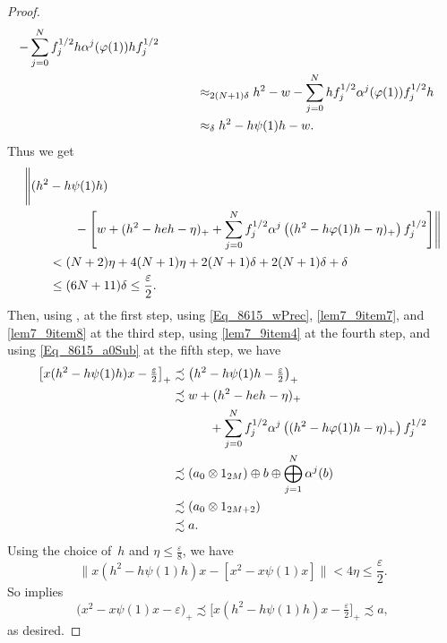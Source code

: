 \documentclass[11pt]{amsart}
\theoremstyle{plain}
\theoremstyle{definition}
\theoremstyle{remark}
\numberwithin{equation}{section}
\newcommand{\et}{\eta}
\newcommand{\ps}{\psi}
\begin{document}
\begin{proof}
\begin{align*}
 - \sum_{j = 0}^{N} f_{j}^{1/2} h \alpha^{j} (\varphi (1)) h f_{j}^{1/2}
\\
& \hspace*{3em} {\mbox{}}
\approx_{2 (N + 1) \delta}
h^{2} - w
 - \sum_{j = 0}^{N} h f_{j}^{1/2} \alpha^{j} (\varphi (1)) f_{j}^{1/2} h
\\
& \hspace*{3em} {\mbox{}}
\approx_{\delta}
h^{2} - h \psi (1) h - w.
\end{align*}
%
Thus we get
%
\begin{align*}
&
\Bigg\| (h^{2} - h \psi (1) h)
\\
& \hspace*{4em} {\mbox{}}
 - \Bigg[ w + (h^{2} - h e h - \eta)_{+}
 + \sum_{j = 0}^{N} f_{j}^{1/2}
\alpha^{j} \left((h^{2} - h \varphi (1) h - \eta)_{+} \right)
     f_{j}^{1/2} \Bigg] \Bigg\|
\\
& \hspace*{2em} {\mbox{}}
 < (N + 2) \eta + 4 (N + 1) \eta
     + 2 (N + 1) \delta + 2 (N + 1) \delta + \delta
\\
& \hspace*{2em} {\mbox{}}
 \leq (6 N + 11) \delta
 \leq \frac{\varepsilon}{2}.
\end{align*}
%
Then, using \cite[Lemma~2.3]{AGJP21}, at the first step,
using \eqref{Eq_8615_wPrec}, \eqref{lem7_9item7},
and \eqref{lem7_9item8} at the third step,
using \eqref{lem7_9item4} at the fourth step,
and using \eqref{Eq_8615_a0Sub} at the fifth step, we have
%
\begin{align*}
\big[ x ( h^2 - h \ps (1) h ) x - \tfrac{\varepsilon}{2} \big]_{+}
&
\precsim \big( h^{2} - h \psi (1) h - \tfrac{\varepsilon}{2} \big)_{+}
\\
&
\precsim w + (h^{2} - h e h - \eta)_{+}
\\
& \hspace*{3em} {\mbox{}}
   + \sum_{j = 0}^{N} f_{j}^{1/2}
      \alpha^{j} \left((h^{2} - h \varphi (1) h - \eta)_{+} \right)
     f_{j}^{1/2}
\\
&
\precsim (a_{0} \otimes 1_{2 M}) \oplus b
 \oplus \bigoplus_{j = 1}^{N} \alpha^{j} (b)
\\
& \precsim (a_{0} \otimes 1_{2 M + 2})
\\
& \precsim  a.
\end{align*}
%
Using the choice of~$h$
and $\eta \leq \tfrac{\varepsilon}{8}$,
we have
\[
\big\| x ( h^2 - h \ps (1) h ) x - [x^2 - x \ps (1) x ] \big\|
 < 4 \et
 \leq \frac{\varepsilon}{2}.
\]
So \cite[Corollary 1.6]{Ph14}
implies
\[
\big( x^2 - x \ps (1) x - \varepsilon \big)_{+}
 \precsim
   \big[ x ( h^2 - h \ps (1) h ) x - \tfrac{\varepsilon}{2} \big]_{+}
 \precsim  a,
\]
as desired.


\end{proof}
\end{document}

